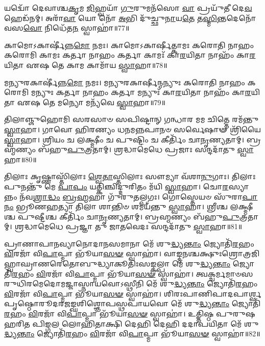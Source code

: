 𑌯𑌦𑍍𑌵𑍋᳴ 𑌦𑍇𑌵𑌾𑌶𑍍𑌚\-\ul{𑌕𑍃}\-𑌮 \ul{𑌜𑌿}\-𑌹𑍍𑌵𑌯𑌾᳴ \ul{𑌗𑍁}\-𑌰𑍁𑌮𑌨᳴𑌸𑍋 \ul{𑌵𑌾} 𑌪𑍍𑌰𑌯𑍁᳴𑌤𑍀 𑌦𑍇\-\ul{𑌵} 𑌹𑍇𑌡᳴𑌨𑌮𑍍। 
𑌅𑌰𑌾᳴\-\ul{𑌵𑌾} 𑌯𑍋 𑌨𑍋᳴ \ul{𑌅}\-𑌭𑌿 𑌦𑍁᳴𑌚𑍍𑌛𑍁\-\ul{𑌨𑌾}\-𑌯\-\ul{𑌤𑍇} 𑌤\-\ul{𑌸𑍍𑌮𑌿}\-𑌨𑍍𑌤𑌦𑍇𑌨𑍋᳴ 𑌵𑌸\-\ul{𑌵𑍋} 𑌨𑌿𑌧𑍇᳴𑌤\-\ul{𑌨} 𑌸𑍍𑌵𑌾𑌹𑌾॑॥77॥ 
\anuvakamend



𑌕𑌾𑌮𑍋𑌽𑌕𑌾𑌰𑍍\mbox{}𑌷𑍀॑𑌨𑍍𑌨\-\ul{𑌮𑍋} 𑌨𑌮𑌃। 
 𑌕𑌾𑌮𑍋𑌽𑌕𑌾𑌰𑍍\mbox{}𑌷𑍀𑌤𑍍𑌕𑌾𑌮𑌃 𑌕𑌰𑍋𑌤𑌿 𑌨𑌾𑌹𑌂 𑌕𑌰𑍋𑌮𑌿 𑌕𑌾𑌮𑌃 𑌕𑌰𑍍𑌤𑌾 𑌨𑌾𑌹𑌂 𑌕𑌰𑍍𑌤𑌾 𑌕𑌾𑌮𑌃᳴ 𑌕𑌾\-\ul{𑌰}\-𑌯𑌿𑌤𑌾 𑌨𑌾𑌹𑌂᳴ 𑌕𑌾\-\ul{𑌰}\-𑌯𑌿𑌤𑌾 𑌏𑌷 𑌤𑍇 𑌕𑌾𑌮 𑌕𑌾𑌮𑌾᳴𑌯 \ul{𑌸𑍍𑌵𑌾}\-𑌹𑌾॥78॥
\anuvakamend

𑌮𑌨𑍍𑌯𑍁𑌰𑌕𑌾𑌰𑍍\mbox{}𑌷𑍀॑𑌨𑍍𑌨\-\ul{𑌮𑍋} 𑌨𑌮𑌃। 
𑌮𑌨𑍍𑌯𑍁𑌰𑌕𑌾𑌰𑍍\mbox{}𑌷𑍀𑌨𑍍𑌮𑌨𑍍𑌯𑍁𑌃 𑌕𑌰𑍋𑌤𑌿 𑌨𑌾𑌹𑌂 𑌕𑌰𑍋𑌮𑌿 𑌮𑌨𑍍𑌯𑍁𑌃 𑌕𑌰𑍍𑌤𑌾 𑌨𑌾𑌹𑌂 𑌕𑌰𑍍𑌤𑌾 𑌮𑌨𑍍𑌯𑍁𑌃᳴ 𑌕𑌾\-\ul{𑌰}\-𑌯𑌿𑌤𑌾 𑌨𑌾𑌹𑌂᳴ 𑌕𑌾\-\ul{𑌰}\-𑌯𑌿𑌤𑌾 𑌏𑌷 𑌤𑍇 𑌮𑌨𑍍𑌯𑍋 𑌮𑌨𑍍𑌯᳴𑌵𑍇 \ul{𑌸𑍍𑌵𑌾}\-𑌹𑌾॥79॥
\anuvakamend

𑌤𑌿𑌲𑌾𑌞𑍍𑌜𑍁𑌹𑍋𑌮𑌿 𑌸𑌰𑌸𑌾𑍞 𑌸𑌪𑌿𑌷𑍍𑌟𑌾𑌨𑍍 𑌗𑌨𑍍𑌧𑌾𑌰 𑌮𑌮 𑌚𑌿𑌤𑍍𑌤𑍇 𑌰𑌮᳴𑌨𑍍𑌤𑍁 \ul{𑌸𑍍𑌵𑌾}\-𑌹𑌾। 
𑌗𑌾𑌵𑍋 𑌹𑌿𑌰𑌣𑍍𑌯𑌂 𑌧𑌨𑌮𑌨𑍍𑌨𑌪𑌾𑌨𑍞 𑌸𑌰𑍍𑌵𑍇𑌷𑌾𑍟 𑌶𑍍𑌰𑌿᳴𑌯𑍈 \ul{𑌸𑍍𑌵𑌾}\-𑌹𑌾। 
𑌶𑍍𑌰𑌿𑌯𑌂 𑌚 𑌲𑌕𑍍𑌷𑍍𑌮𑍀𑌂 𑌚 𑌪𑍁𑌷𑍍𑌟𑌿𑌂 𑌚 𑌕𑍀𑌰𑍍𑌤𑌿𑌂᳴ 𑌚𑌾\-\ul{𑌨𑍃}\-𑌣𑍍𑌯𑌤𑌾𑌮𑍍। 
𑌬𑍍𑌰𑌹𑍍𑌮𑌣𑍍𑌯𑌂 𑌬᳴𑌹𑍁\-\ul{𑌪𑍁}\-𑌤𑍍𑌰𑌤𑌾𑌮𑍍। 
𑌶𑍍𑌰𑌦𑍍𑌧𑌾𑌮𑍇𑌧𑍇 𑌪𑍍𑌰𑌜𑌾𑌃 𑌸𑌨𑍍𑌦𑌦𑌾᳴𑌤𑍁 \ul{𑌸𑍍𑌵𑌾}\-𑌹𑌾॥80॥
\anuvakamend

𑌤𑌿𑌲𑌾𑌃 𑌕𑍃𑌷𑍍𑌣𑌾𑌸𑍍𑌤𑌿᳴𑌲𑌾𑌃 \ul{𑌶𑍍𑌵𑍇}\-\-\ul{𑌤𑌾}\-𑌸𑍍𑌤𑌿𑌲𑌾𑌃 𑌸𑍗𑌮𑍍𑌯𑌾 𑌵᳴𑌶𑌾\-\ul{𑌨𑍁}\-𑌗𑌾𑌃। 
𑌤𑌿𑌲𑌾𑌃 𑌪𑍁𑌨𑌨𑍍𑌤𑍁᳴ 𑌮𑍇 \ul{𑌪𑌾}\-\-\ul{𑌪𑌂} 𑌯𑌤𑍍𑌕𑌿𑌞𑍍𑌚𑌿𑌦𑍍𑌦𑍁𑌰𑌿𑌤𑌂 𑌮᳴𑌯𑌿 \ul{𑌸𑍍𑌵𑌾}\-𑌹𑌾। 
𑌚𑍋\-\ul{𑌰}\-𑌸𑍍𑌯𑌾𑌨𑍍𑌨𑌂 𑌨᳴𑌵\-\ul{𑌶𑍍𑌰𑌾}\-\-\ul{𑌦𑍍𑌧𑌂} \ul{𑌬𑍍𑌰}\-\-\ul{𑌹𑍍𑌮}\-𑌹𑌾 𑌗𑍁᳴𑌰𑍁\-\ul{𑌤}\-𑌲𑍍𑌪𑌗𑌃। 
𑌗𑍋𑌸𑍍𑌤𑍇𑌯𑍞 𑌸𑍁᳴𑌰𑌾\-\ul{𑌪𑌾}\-\-\ul{𑌨𑌂} 𑌭𑍍𑌰𑍂𑌣𑌹𑌤𑍍𑌯𑌾 𑌤𑌿𑌲𑌾 𑌶𑌾𑌨𑍍𑌤𑌿𑍞 𑌶𑌮𑌯᳴𑌨𑍍𑌤𑍁 \ul{𑌸𑍍𑌵𑌾}\-𑌹𑌾। 
𑌶𑍍𑌰𑍀𑌶𑍍𑌚 𑌲𑌕𑍍𑌷𑍍𑌮𑍀𑌶𑍍𑌚 𑌪𑍁𑌷𑍍𑌟𑍀𑌶𑍍𑌚 𑌕𑍀𑌰𑍍𑌤𑌿𑌂᳴ 𑌚𑌾\-\ul{𑌨𑍃}\-𑌣𑍍𑌯𑌤𑌾𑌮𑍍। 
𑌬𑍍𑌰𑌹𑍍𑌮𑌣𑍍𑌯𑌂 𑌬᳴𑌹𑍁\-\ul{𑌪𑍁}\-𑌤𑍍𑌰𑌤𑌾𑌮𑍍। 
𑌶𑍍𑌰𑌦𑍍𑌧𑌾𑌮𑍇𑌧𑍇 𑌪𑍍𑌰𑌜𑍍𑌞𑌾 𑌤𑍁 𑌜𑌾𑌤𑌵𑍇𑌦𑌃 𑌸𑌨𑍍𑌦𑌦𑌾᳴𑌤𑍁 \ul{𑌸𑍍𑌵𑌾}\-𑌹𑌾॥81॥
 \anuvakamend

𑌪𑍍𑌰𑌾𑌣𑌾𑌪𑌾𑌨𑌵𑍍𑌯𑌾𑌨𑍋𑌦𑌾𑌨𑌸𑌮𑌾𑌨𑌾 𑌮𑍇᳴ 𑌶𑍁\-\ul{𑌦𑍍𑌧𑍍𑌯}\-\-\ul{𑌨𑍍𑌤𑌾𑌂} 𑌜𑍍𑌯𑍋𑌤𑌿᳴\-\ul{𑌰}\-𑌹𑌂 \ul{𑌵𑌿}\-𑌰𑌜𑌾᳴ 𑌵𑌿\-\ul{𑌪𑌾}\-𑌪𑍍𑌮𑌾 𑌭𑍂᳴𑌯𑌾\-\ul{𑌸}\-\-\ul{𑍟} 𑌸𑍍𑌵𑌾𑌹𑌾॑।
𑌵𑌾𑌙𑍍𑌮𑌨𑌶𑍍𑌚𑌕𑍍𑌷𑍁𑌃𑌶𑍍𑌰𑍋𑌤𑍍𑌰𑌜𑌿𑌹𑍍𑌵𑌾𑌘𑍍𑌰𑌾𑌣𑌰𑍇𑌤𑍋\-𑌬𑍁𑌦𑍍𑌧𑍍𑌯𑌾𑌕𑍂𑌤𑌿𑌃\-𑌸𑌙𑍍𑌕𑌲𑍍𑌪𑌾 𑌮𑍇᳴ 𑌶𑍁\-\ul{𑌦𑍍𑌧𑍍𑌯}\-\-\ul{𑌨𑍍𑌤𑌾𑌂} 𑌜𑍍𑌯𑍋𑌤𑌿᳴\-\ul{𑌰}\-𑌹𑌂 \ul{𑌵𑌿}\-𑌰𑌜𑌾᳴ 𑌵𑌿\-\ul{𑌪𑌾}\-𑌪𑍍𑌮𑌾 𑌭𑍂᳴𑌯𑌾\-\ul{𑌸}\-\-\ul{𑍟} 𑌸𑍍𑌵𑌾𑌹𑌾॑। 
𑌤𑍍𑌵𑌕𑍍𑌚𑌰𑍍𑌮𑌮𑌾𑍞𑌸𑌰𑍁𑌧𑌿𑌰𑌮𑍇𑌦𑍋𑌮𑌜𑍍𑌜𑌾𑌸𑍍𑌨𑌾𑌯𑌵𑍋\-𑌽𑌸𑍍𑌥𑍀𑌨𑌿  𑌮𑍇᳴ 𑌶𑍁\-\ul{𑌦𑍍𑌧𑍍𑌯}\-\-\ul{𑌨𑍍𑌤𑌾𑌂} 𑌜𑍍𑌯𑍋𑌤𑌿᳴\-\ul{𑌰}\-𑌹𑌂 \ul{𑌵𑌿}\-𑌰𑌜𑌾᳴ 𑌵𑌿\-\ul{𑌪𑌾}\-𑌪𑍍𑌮𑌾 𑌭𑍂᳴𑌯𑌾\-\ul{𑌸}\-\-\ul{𑍟} 𑌸𑍍𑌵𑌾𑌹𑌾॑। 
𑌶𑌿𑌰𑌃𑌪𑌾𑌣𑌿𑌪𑌾𑌦𑌪𑌾𑌰𑍍𑌶𑍍𑌵𑌪𑍃𑌷𑍍𑌠𑍋𑌰𑍂𑌦𑌰𑌜𑌙𑍍𑌘𑌶𑌿𑌶𑍍𑌞𑍋𑌪𑌸𑍍𑌥𑌪𑌾𑌯𑌵𑍋  𑌮𑍇᳴ 𑌶𑍁\-\ul{𑌦𑍍𑌧𑍍𑌯}\-\-\ul{𑌨𑍍𑌤𑌾𑌂} 𑌜𑍍𑌯𑍋𑌤𑌿᳴\-\ul{𑌰}\-𑌹𑌂 \ul{𑌵𑌿}\-𑌰𑌜𑌾᳴ 𑌵𑌿\-\ul{𑌪𑌾}\-𑌪𑍍𑌮𑌾 𑌭𑍂᳴𑌯𑌾\-\ul{𑌸}\-\-\ul{𑍟} 𑌸𑍍𑌵𑌾𑌹𑌾॑।
𑌉𑌤𑍍𑌤𑌿𑌷𑍍𑌠 𑌪𑍁𑌰𑍁𑌷 𑌹𑌰𑌿𑌤 𑌪𑌿𑌙𑍍𑌗𑌲 𑌲𑍋𑌹𑌿𑌤𑌾𑌕𑍍𑌷𑌿 𑌦𑍇𑌹𑌿 𑌦𑍇𑌹𑌿 𑌦𑌦𑌾𑌪𑌯𑌿𑌤𑌾 𑌮𑍇᳴ 𑌶𑍁\-\ul{𑌦𑍍𑌧𑍍𑌯}\-\-\ul{𑌨𑍍𑌤𑌾𑌂} 𑌜𑍍𑌯𑍋𑌤𑌿᳴\-\ul{𑌰}\-𑌹𑌂 \ul{𑌵𑌿}\-𑌰𑌜𑌾᳴ 𑌵𑌿\-\ul{𑌪𑌾}\-𑌪𑍍𑌮𑌾 𑌭𑍂᳴𑌯𑌾\-\ul{𑌸}\-\-\ul{𑍟} 𑌸𑍍𑌵𑌾𑌹𑌾॑॥82॥ 
\anuvakamend

